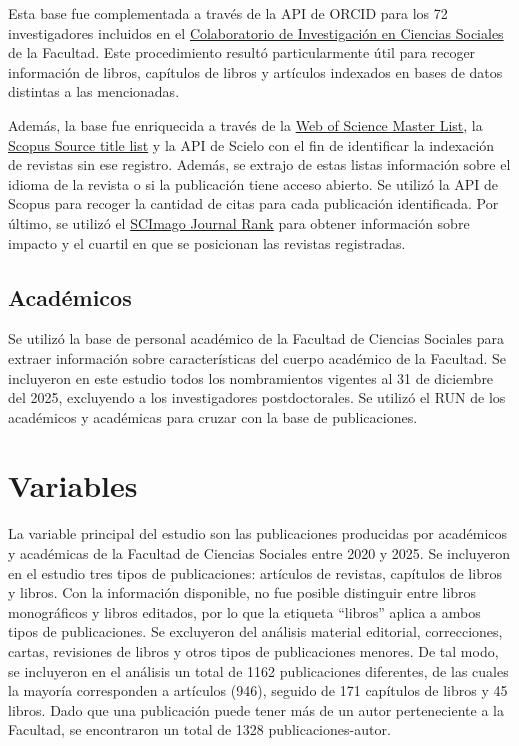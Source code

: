 \documentclass[
  spanish,
  a4paper,
  oneside]{scrbook}
\begin{document}
Esta base fue complementada a través de la API de ORCID para los 72
investigadores incluidos en el
\href{https://colaboratoriocienciassociales.uchile.cl/}{Colaboratorio de
Investigación en Ciencias Sociales} de la Facultad. Este procedimiento
resultó particularmente útil para recoger información de libros,
capítulos de libros y artículos indexados en bases de datos distintas a
las mencionadas.

Además, la base fue enriquecida a través de la
\href{https://www.webofscience.com/wos/mjl/collection-list-downloads}{Web
of Science Master List}, la
\href{https://www.elsevier.com/products/scopus/content\#4-titles-on-scopus}{Scopus
Source title list} y la API de Scielo con el fin de identificar la
indexación de revistas sin ese registro. Además, se extrajo de estas
listas información sobre el idioma de la revista o si la publicación
tiene acceso abierto. Se utilizó la API de Scopus para recoger la
cantidad de citas para cada publicación identificada. Por último, se
utilizó el \href{https://www.scimagojr.com/journalrank.php}{SCImago
Journal Rank} para obtener información sobre impacto y el cuartil en que
se posicionan las revistas registradas.

\subsection{Académicos}\label{acaduxe9micos}

Se utilizó la base de personal académico de la Facultad de Ciencias
Sociales para extraer información sobre características del cuerpo
académico de la Facultad. Se incluyeron en este estudio todos los
nombramientos vigentes al 31 de diciembre del 2025, excluyendo a los
investigadores postdoctorales. Se utilizó el RUN de los académicos y
académicas para cruzar con la base de publicaciones.

\section{Variables}\label{variables-1}

La variable principal del estudio son las publicaciones producidas por
académicos y académicas de la Facultad de Ciencias Sociales entre 2020 y
2025. Se incluyeron en el estudio tres tipos de publicaciones: artículos
de revistas, capítulos de libros y libros. Con la información
disponible, no fue posible distinguir entre libros monográficos y libros
editados, por lo que la etiqueta ``libros'' aplica a ambos tipos de
publicaciones. Se excluyeron del análisis material editorial,
correcciones, cartas, revisiones de libros y otros tipos de
publicaciones menores. De tal modo, se incluyeron en el análisis un
total de 1162 publicaciones diferentes, de las cuales la mayoría
corresponden a artículos (946), seguido de 171 capítulos de libros y 45
libros. Dado que una publicación puede tener más de un autor
perteneciente a la Facultad, se encontraron un total de 1328
publicaciones-autor.
\end{document}
